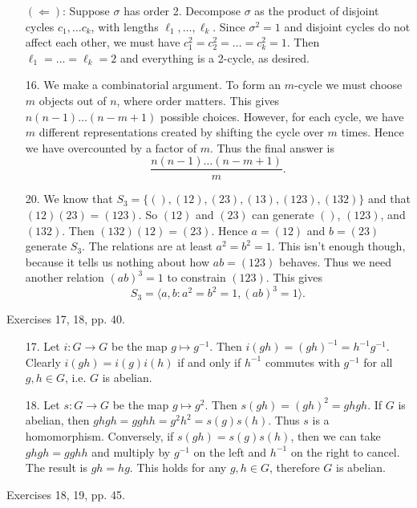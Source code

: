 \documentclass{article}
\begin{document}
\begin{enumerate}
    $(\Leftarrow)$: Suppose $\sigma$ has order 2. Decompose $\sigma$ as the product of disjoint cycles $c_1, \dots c_k$, with lengths $\ell_1, \dots, \ell_k$. Since $\sigma^2 = 1$ and disjoint cycles do not affect each other, we must have $c_1^2 = c_2^2 = \dots = c_k^2 = 1$. Then $\ell_1 = \dots = \ell_k = 2$ and everything is a 2-cycle, as desired.

    \item[16.] We make a combinatorial argument. To form an $m$-cycle we must choose $m$ objects out of $n$, where order matters. This gives $n(n-1) \dots (n - m + 1)$ possible choices. However, for each cycle, we have $m$ different representations created by shifting the cycle over $m$ times. Hence we have overcounted by a factor of $m$. Thus the final answer is 
    \[\frac{n(n-1)\dots(n-m+1)}{m}.\] 

    \item[20.] We know that $S_3 = \{(), (12), (23), (13), (123), (132)\}$ and that $(12)(23) = (123)$. So $(12)$ and $(23)$ can generate $()$, $(123)$, and $(132)$. Then $(132)(12) = (23)$. Hence $a = (12)$ and $b = (23)$ generate $S_3$. The relations are at least $a^2 = b^2 = 1$. 
    This isn't enough though, because it tells us nothing about how $ab = (123)$ behaves. Thus we need another relation $(ab)^3 = 1$ to constrain $(123)$. This gives \[S_3 = \langle a, b : a^2 = b^2 = 1, (ab)^3 = 1\rangle.\]
\end{enumerate}

Exercises 17, 18, pp. 40.

\begin{enumerate}
    \item[17.] Let $i : G \to G$ be the map $g \mapsto g^{-1}$. Then $i(gh) = (gh)^{-1} = h^{-1}g^{-1}$. Clearly $i(gh) = i(g)i(h)$ if and only if $h^{-1}$ commutes with $g^{-1}$ for all $g, h \in G$, i.e. $G$ is abelian.
    \item[18.] Let $s : G \to G$ be the map $g \mapsto g^2$. Then $s(gh) = (gh)^2 = ghgh$. If $G$ is abelian, then $ghgh = gghh = g^2 h^2 = s(g)s(h)$. Thus $s$ is a homomorphism. Conversely, if $s(gh) = s(g)s(h)$, then we can take $ghgh = gghh$ and multiply by $g^{-1}$ on the left and $h^{-1}$ on the right to cancel. The result is $gh = hg$. This holds for any $g, h \in G$, therefore $G$ is abelian.
\end{enumerate}

Exercises 18, 19, pp. 45.
\end{document}
